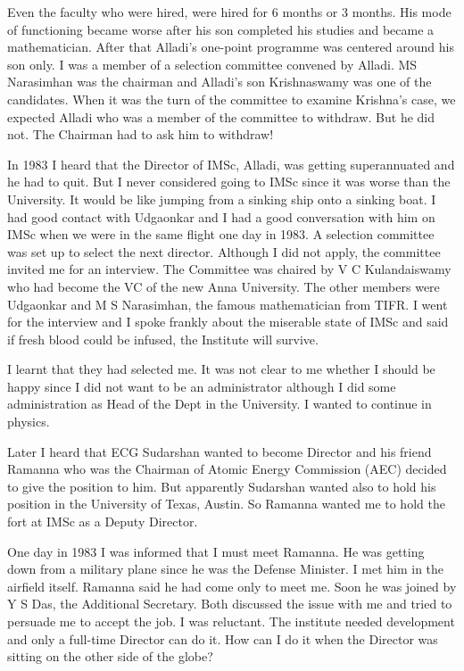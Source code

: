 Even the faculty who were hired, were hired for 6 months or 3 months. 
His mode of functioning became worse after his son completed his studies 
and became a mathematician. After that Alladi's one-point programme was 
centered around his son only. I was a member of a selection committee 
convened by Alladi. MS Narasimhan was the chairman and Alladi's son 
Krishnaswamy was one of the candidates. When it was the turn of the 
committee to examine Krishna's case, we expected Alladi who was a member 
of the committee to withdraw. But he did not. The Chairman had to ask 
him to withdraw!

In 1983 I heard that the Director of IMSc, Alladi, was getting 
superannuated and he had to quit. But I never considered going to IMSc 
since it was worse than the University. It would be like jumping from a 
sinking ship onto a sinking boat. I had good contact with Udgaonkar and 
I had a good conversation with him on IMSc when we were in the same 
flight one day in 1983. A selection committee was set up to select the 
next director. Although I did not apply, the committee invited me for an 
interview. The Committee was chaired by V C Kulandaiswamy who had become 
the VC of the new Anna University. The other members were Udgaonkar and 
M S Narasimhan, the famous mathematician from TIFR. I went for the 
interview and I spoke frankly about the miserable state of IMSc and said 
if fresh blood could be infused, the Institute will survive.

I learnt that they had selected me. It was not clear to me whether I 
should be happy since I did not want to be an administrator although I 
did some administration as Head of the Dept in the University. I wanted 
to continue in physics.

Later I heard that ECG Sudarshan wanted to become Director and his 
friend Ramanna who was the Chairman of Atomic Energy Commission (AEC) 
decided to give the position to him. But apparently Sudarshan wanted 
also to hold his position in the University of Texas, Austin. So Ramanna 
wanted me to hold the fort at IMSc as a Deputy Director.

One day in 1983 I was informed that I must meet Ramanna. He was getting 
down from a military plane since he was the Defense Minister. I met him 
in the airfield itself. Ramanna said he had come only to meet me. Soon 
he was joined by Y S Das, the Additional Secretary. Both discussed the 
issue with me and tried to persuade me to accept the job. I was 
reluctant. The institute needed development and only a full-time 
Director can do it. How can I do it when the Director was sitting on the 
other side of the globe?

